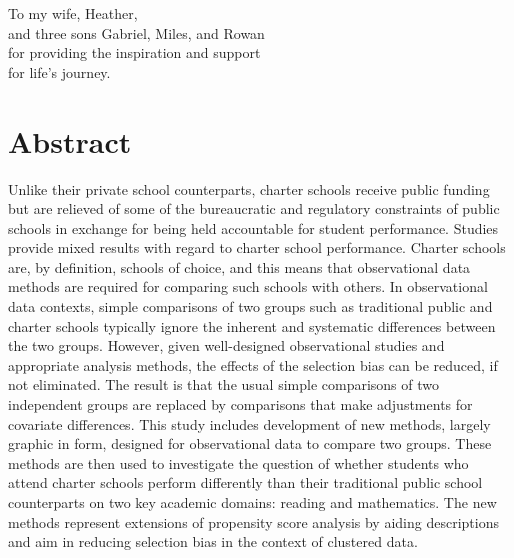 \documentclass[letterpaper,12p,twoside]{article} %
\begin{document}

{}
\vspace*{2.5 in}
\begin{center}
\noindent To my wife, Heather,\\and three sons Gabriel, Miles, and Rowan\\for providing the inspiration and support\\for life's journey.
\end{center}
\vspace*{\fill}
\newpage

\setcounter{page}{3}

\cleardoublepage
\section{Abstract}

Unlike their private school counterparts, charter schools receive public funding but are relieved of some of the bureaucratic and regulatory constraints of public schools in exchange for being held accountable for student performance. Studies provide mixed results with regard to charter school performance. Charter schools are, by definition, schools of choice, and this means that observational data methods are required for comparing such schools with others. In observational data contexts, simple comparisons of two groups such as traditional public and charter schools typically ignore the inherent and systematic differences between the two groups. %
However, given well-designed observational studies and appropriate analysis methods, the effects of the selection bias can be reduced, if not eliminated. The result is that the usual simple comparisons of two independent groups are replaced by comparisons that make adjustments for covariate differences. This study includes development of new methods, largely graphic in form, designed for observational data to compare two groups. These methods are then used to investigate the question of whether students who attend charter schools perform differently than their traditional public school counterparts on two key academic domains: reading and mathematics. The new methods represent extensions of propensity score analysis  by aiding descriptions and aim in reducing selection bias in the context of clustered data.
\end{document}

